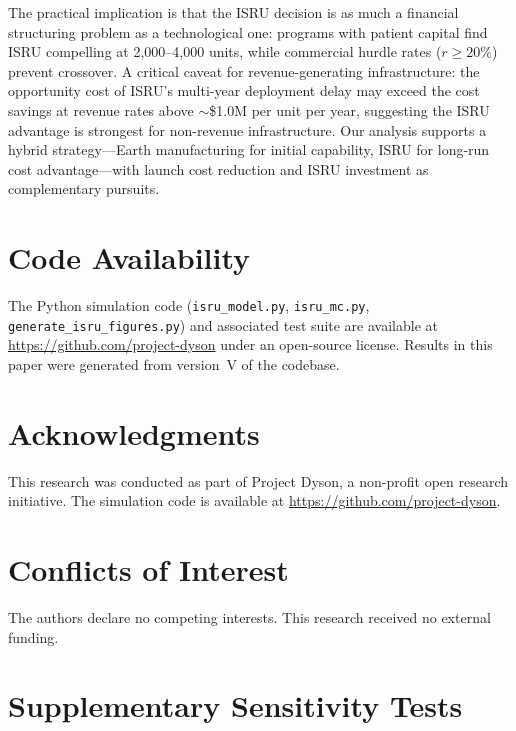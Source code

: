 \documentclass[preprint,12pt]{elsarticle}
\begin{document}
The practical implication is that the ISRU decision is as much a financial structuring problem as a technological one: programs with patient capital find ISRU compelling at 2{,}000--4{,}000 units, while commercial hurdle rates ($r \geq 20\%$) prevent crossover. A critical caveat for revenue-generating infrastructure: the opportunity cost of ISRU's multi-year deployment delay may exceed the cost savings at revenue rates above $\sim$\$1.0M per unit per year, suggesting the ISRU advantage is strongest for non-revenue infrastructure. Our analysis supports a hybrid strategy---Earth manufacturing for initial capability, ISRU for long-run cost advantage---with launch cost reduction and ISRU investment as complementary pursuits.

\section*{Code Availability}

The Python simulation code (\texttt{isru\_model.py}, \texttt{isru\_mc.py}, \texttt{generate\_isru\_figures.py}) and associated test suite are available at \url{https://github.com/project-dyson} under an open-source license. Results in this paper were generated from version~V of the codebase.


\section*{Acknowledgments}

This research was conducted as part of Project Dyson, a non-profit open research initiative. The simulation code is available at \url{https://github.com/project-dyson}.

\section*{Conflicts of Interest}

The authors declare no competing interests. This research received no external funding.

\appendix
\section{Supplementary Sensitivity Tests}
\label{sec:appendix_sensitivity}
\end{document}
